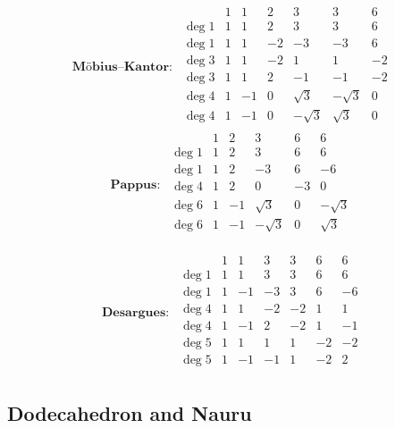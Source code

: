 \documentclass[11pt]{article}
\theoremstyle{remark}
\begin{document}
\[
\textbf{M\"obius--Kantor}:\;
\begin{array}{l|rrrrrr}
 & 1 & 1 & 2 & 3 & 3 & 6\\
\hline
\deg 1 & 1 & 1 & 2 & 3 & 3 & 6\\
\deg 1 & 1 & 1 & -2 & -3 & -3 & 6\\
\deg 3 & 1 & 1 & -2 & 1 & 1 & -2\\
\deg 3 & 1 & 1 & 2 & -1 & -1 & -2\\
\deg 4 & 1 & -1 & 0 & \sqrt3 & -\sqrt3 & 0\\
\deg 4 & 1 & -1 & 0 & -\sqrt3 & \sqrt3 & 0\\
\end{array}
\]
\[
\textbf{Pappus}:\;
\begin{array}{l|rrrrr}
 & 1 & 2 & 3 & 6 & 6\\
\hline
\deg 1 & 1 & 2 & 3 & 6 & 6\\
\deg 1 & 1 & 2 & -3 & 6 & -6\\
\deg 4 & 1 & 2 & 0 & -3 & 0\\
\deg 6 & 1 & -1 & \sqrt3 & 0 & -\sqrt3\\
\deg 6 & 1 & -1 & -\sqrt3 & 0 & \sqrt3\\
\end{array}
\]

\[
\textbf{Desargues}:\;
\begin{array}{l|rrrrrr}
 & 1 & 1 & 3 & 3 & 6 & 6\\
\hline
\deg 1 & 1 & 1 & 3 & 3 & 6 & 6\\
\deg 1 & 1 & -1 & -3 & 3 & 6 & -6\\
\deg 4 & 1 & 1 & -2 & -2 & 1 & 1\\
\deg 4 & 1 & -1 & 2 & -2 & 1 & -1\\
\deg 5 & 1 & 1 & 1 & 1 & -2 & -2\\
\deg 5 & 1 & -1 & -1 & 1 & -2 & 2\\
\end{array}
\]

\subsection{Dodecahedron and Nauru}
\end{document}
